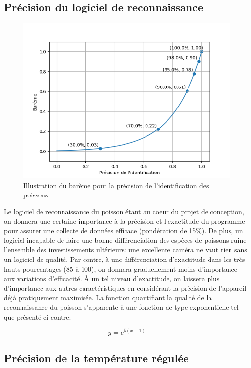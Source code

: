 \subsection{Précision du logiciel de reconnaissance}
\label{Pldr}

\begin{figure}[htb!]
    \centering
    \includegraphics[width=0.45\linewidth]{fig/bareme_ident.png}
    \caption{Illustration du barème pour la précision de l'identification des poissons}
    \label{fig:bareme_precision}
\end{figure}

Le logiciel de reconnaissance du poisson étant au coeur du projet de conception, on donnera une certaine importance à la précision et l'exactitude du programme pour assurer une collecte de données efficace (pondération de 15\%). De plus, un logiciel incapable de faire une bonne différenciation des espèces de poissons ruine l'ensemble des investissements ultérieurs: une excellente caméra ne vaut rien sans un logiciel de qualité. Par contre, à une différenciation d'exactitude dans les très hauts pourcentages (85 à 100), on donnera graduellement moins d'importance aux variations d'efficacité. À un tel niveau d'exactitude, on laissera plus d'importance aux autres caractéristiques en considérant la précision de l'appareil déjà pratiquement maximisée. La fonction quantifiant la qualité de la reconnaissance du poisson s'apparente à une fonction de type exponentielle tel que présenté ci-contre:

\begin{equation}
    y = e^{5(x-1)}
    \label{eq:bareme_precision}
\end{equation}

\subsection{Précision de la température régulée}
\label{Ptree}

